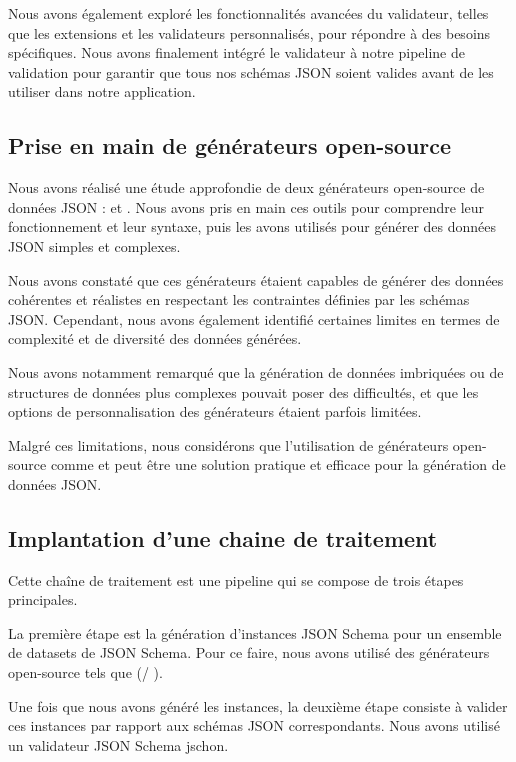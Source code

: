 \documentclass{article}
\begin{document}
    Nous avons également exploré les fonctionnalités avancées du validateur, telles que les extensions et les validateurs personnalisés, pour répondre à des besoins spécifiques. Nous avons finalement intégré le validateur à notre pipeline de validation pour garantir que tous nos schémas JSON soient valides avant de les utiliser dans notre application.
    
    \subsection{Prise en main de générateurs open-source}

    Nous avons réalisé une étude approfondie de deux générateurs open-source de données JSON : \jsf et \je. Nous avons pris en main ces outils pour comprendre leur fonctionnement et leur syntaxe, puis les avons utilisés pour générer des données JSON simples et complexes.

    Nous avons constaté que ces générateurs étaient capables de générer des données cohérentes et réalistes en respectant les contraintes définies par les schémas JSON. Cependant, nous avons également identifié certaines limites en termes de complexité et de diversité des données générées.

    Nous avons notamment remarqué que la génération de données imbriquées ou de structures de données plus complexes pouvait poser des difficultés, et que les options de personnalisation des générateurs étaient parfois limitées.

    Malgré ces limitations, nous considérons que l'utilisation de générateurs open-source comme \jsf et \je peut être une solution pratique et efficace pour la génération de données JSON.
    
    \subsection{Implantation d'une chaine de traitement}

Cette chaîne de traitement est une pipeline qui se compose de trois étapes principales.

La première étape est la génération d'instances JSON Schema pour un ensemble de datasets de JSON Schema. Pour ce faire, nous avons utilisé des générateurs open-source tels que (\jsf / \je).

Une fois que nous avons généré les instances, la deuxième étape consiste à valider ces instances par rapport aux schémas JSON correspondants. Nous avons utilisé un validateur JSON Schema jschon.
\end{document}
